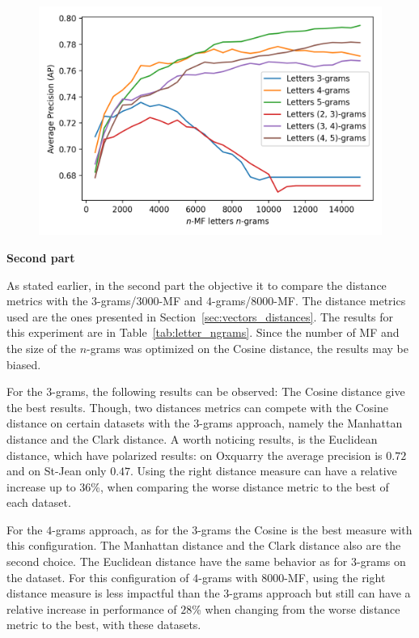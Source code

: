 \begin{figure}
  \label{fig:letter_ngrams_st_jean}
  \includegraphics[width=\linewidth]{img/letter_ngrams_st_jean.png}
\end{figure}

\textbf{Second part}

As stated earlier, in the second part the objective it to compare the distance metrics with the $3$-grams/$3000$-MF and $4$-grams/$8000$-MF.
The distance metrics used are the ones presented in Section~\ref{sec:vectors_distances}.
The results for this experiment are in Table~\ref{tab:letter_ngrams}.
Since the number of MF and the size of the $n$-grams was optimized on the Cosine distance, the results may be biased.

For the $3$-grams, the following results can be observed:
The Cosine distance give the best results.
Though, two distances metrics can compete with the Cosine distance on certain datasets with the $3$-grams approach, namely the Manhattan distance and the Clark distance.
A worth noticing results, is the Euclidean distance, which have polarized results: on Oxquarry the average precision is $0.72$ and on St-Jean only $0.47$.
Using the right distance measure can have a relative increase up to $36$\%, when comparing the worse distance metric to the best of each dataset.

For the $4$-grams approach, as for the $3$-grams the Cosine is the best measure with this configuration.
The Manhattan distance and the Clark distance also are the second choice.
The Euclidean distance have the same behavior as for $3$-grams on the dataset.
For this configuration of $4$-grams with $8000$-MF, using the right distance measure is less impactful than the $3$-grams approach but still can have a relative increase in performance of $28$\% when changing from the worse distance metric to the best, with these datasets.

